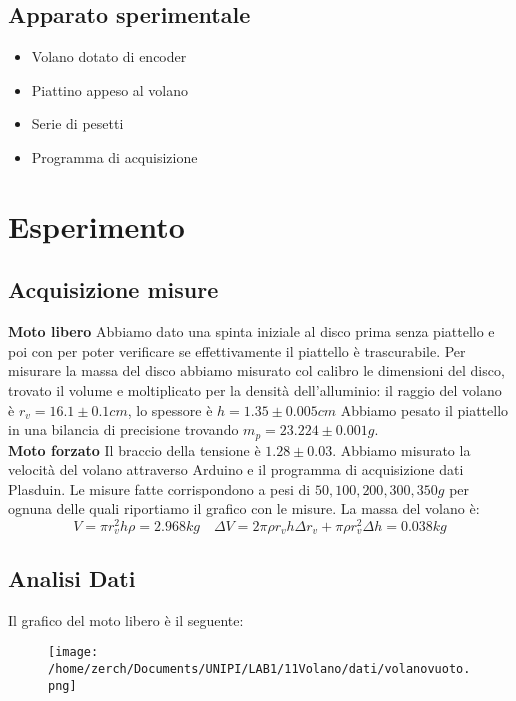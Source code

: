 \documentclass[a4paper,10pt]{article}
\begin{document}
\subsection{Apparato sperimentale}
\begin{itemize}
\item{Volano dotato di encoder}
\item{Piattino appeso al volano}
\item{Serie di pesetti}
\item{Programma di acquisizione}
\end{itemize}

\section{Esperimento}
\subsection{Acquisizione misure}
\textbf{Moto libero} Abbiamo dato una spinta iniziale al disco prima senza piattello e poi con per poter verificare se effettivamente il piattello è trascurabile. 
Per misurare la massa del disco abbiamo misurato col calibro le dimensioni del disco, trovato il volume e moltiplicato per la densità dell'alluminio:
il raggio del volano è $r_v=16.1\pm0.1cm$, lo spessore è $h=1.35\pm0.005cm$
Abbiamo pesato il piattello in una bilancia di precisione trovando $m_p=23.224\pm0.001g$.
\\ \textbf{Moto forzato} Il braccio della tensione è $1.28\pm0.03$. Abbiamo misurato la velocità del volano attraverso Arduino e il programma di acquisizione dati Plasduin. Le misure fatte 
corrispondono a pesi di $50, 100, 200, 300, 350 g$ per ognuna delle quali riportiamo il grafico con le misure.
La massa del volano è:
\begin{equation}
V=\pi r_v^2h\rho=2.968kg \quad \Delta V= 2\pi\rho r_vh\Delta r_v+\pi\rho r_v^2\Delta h=0.038kg
\end{equation}

\subsection{Analisi Dati}
Il grafico del moto libero è il seguente:
\pagebreak

 \begin {figure}[!htb]
\begin{center}
\texttt{[image: /home/zerch/Documents/UNIPI/LAB1/11Volano/dati/volanovuoto.png]}
\end{center}
\end{figure}
\end{document}
